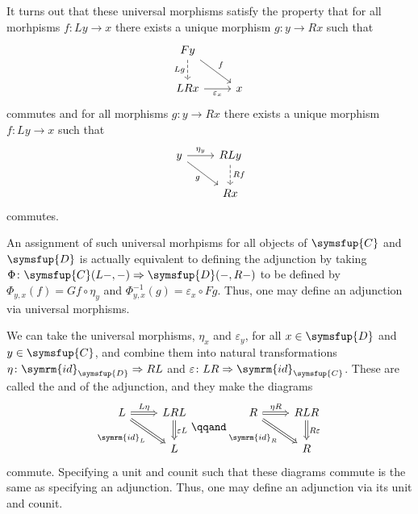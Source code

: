 \documentclass[fleqn]{NotesClass}
\newcommand{\cat}[1]{\symsfup{#1}}
\newcommand{\id}{\symrm{id}}
\newcommand{\natTrans}{\Rightarrow}
\begin{document}
    It turns out that these universal morphisms satisfy the property that for all morhpisms \(f \colon Ly \to x\) there exists a unique morphism \(g \colon y \to Rx\) such that
    \begin{equation}
        \begin{tikzcd}
            Fy \arrow[dr, "f"] \arrow[d, dashed, "Lg"']\\
            LRx \arrow[r, "\varepsilon_x"'] & x
        \end{tikzcd}
    \end{equation}
    commutes and for all morphisms \(g \colon y \to Rx\) there exists a unique morphism \(f \colon Ly \to x\) such that 
    \begin{equation}
        \begin{tikzcd}
            y \arrow[r, "\eta_y"] \arrow[dr, "g"'] & RLy \arrow[d, dashed, "Rf"]\\
            & Rx
        \end{tikzcd}
    \end{equation}
    commutes.
    
    An assignment of such universal morhpisms for all objects of \(\cat{C}\) and \(\cat{D}\) is actually equivalent to defining the adjunction by taking \(\Phi \colon \cat{C}(L-, -) \natTrans \cat{D}(-, R-)\) to be defined by \(\Phi_{y,x}(f) = Gf \circ \eta_y\) and \(\Phi_{y,x}^{-1}(g) = \varepsilon_x \circ Fg\).
    Thus, one may define an adjunction via universal morphisms.
    
    We can take the universal morphisms, \(\eta_x\) and \(\varepsilon_y\), for all \(x \in \cat{D}\) and \(y \in \cat{C}\), and combine them into natural transformations \(\eta \colon \id_{\cat{D}} \natTrans RL\) and \(\varepsilon \colon LR \natTrans \id_{\cat{C}}\).
    These are called the  and  of the adjunction, and they make the diagrams
    \begin{equation}
        \begin{tikzcd}
            L \arrow[r, Rightarrow, "L\eta"] \arrow[dr, Rightarrow, "\id_L"'] & LRL \arrow[d, Rightarrow, "\varepsilon L"]\\
            & L
        \end{tikzcd}
        \qqand 
        \begin{tikzcd}
            R \arrow[r, Rightarrow, "\eta R"] \arrow[dr, Rightarrow, "\id_R"'] & RLR \arrow[d, Rightarrow, "R\varepsilon"]\\
            & R
        \end{tikzcd}
    \end{equation}
    commute.
    Specifying a unit and counit such that these diagrams commute is the same as specifying an adjunction.
    Thus, one may define an adjunction via its unit and counit.
    
\end{document}
